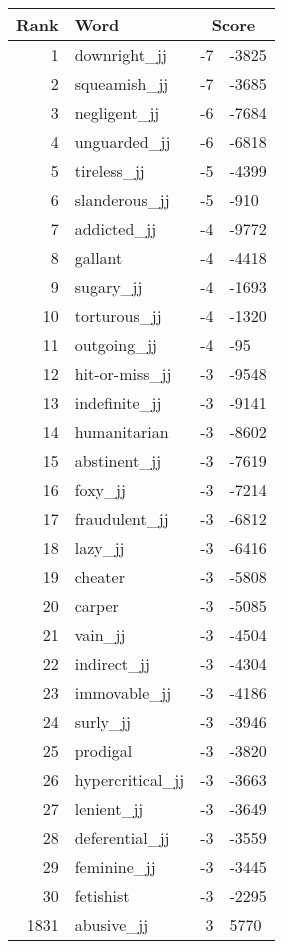\begin{longtable}[!htbp]{| rlr@{.}l |}
    \hline
    \textbf{Rank} & \textbf{Word} & \multicolumn{2}{c|}{\textbf{Score}} \\
    \hline
    \endhead
    1 & downright\_jj & -7 & -3825 \\
    2 & squeamish\_jj & -7 & -3685 \\
    3 & negligent\_jj & -6 & -7684 \\
    4 & unguarded\_jj & -6 & -6818 \\
    5 & tireless\_jj & -5 & -4399 \\
    6 & slanderous\_jj & -5 & -910 \\
    7 & addicted\_jj & -4 & -9772 \\
    8 & gallant & -4 & -4418 \\
    9 & sugary\_jj & -4 & -1693 \\
    10 & torturous\_jj & -4 & -1320 \\
    11 & outgoing\_jj & -4 & -95 \\
    12 & hit-or-miss\_jj & -3 & -9548 \\
    13 & indefinite\_jj & -3 & -9141 \\
    14 & humanitarian & -3 & -8602 \\
    15 & abstinent\_jj & -3 & -7619 \\
    16 & foxy\_jj & -3 & -7214 \\
    17 & fraudulent\_jj & -3 & -6812 \\
    18 & lazy\_jj & -3 & -6416 \\
    19 & cheater & -3 & -5808 \\
    20 & carper & -3 & -5085 \\
    21 & vain\_jj & -3 & -4504 \\
    22 & indirect\_jj & -3 & -4304 \\
    23 & immovable\_jj & -3 & -4186 \\
    24 & surly\_jj & -3 & -3946 \\
    25 & prodigal & -3 & -3820 \\
    26 & hypercritical\_jj & -3 & -3663 \\
    27 & lenient\_jj & -3 & -3649 \\
    28 & deferential\_jj & -3 & -3559 \\
    29 & feminine\_jj & -3 & -3445 \\
    30 & fetishist & -3 & -2295 \\
    1831 & abusive\_jj & 3 & 5770 \\

\end{longtable}
